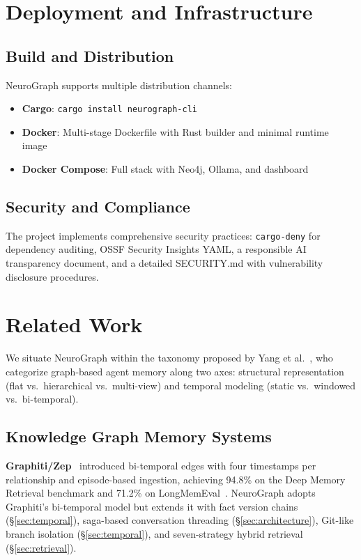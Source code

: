 \documentclass[11pt,a4paper,twocolumn]{article}
\begin{document}
\section{Deployment and Infrastructure}
\label{sec:deployment}

\subsection{Build and Distribution}

NeuroGraph supports multiple distribution channels:
\begin{itemize}[leftmargin=*]
  \item \textbf{Cargo}: \texttt{cargo install neurograph-cli}
  \item \textbf{Docker}: Multi-stage Dockerfile with Rust builder
    and minimal runtime image
  \item \textbf{Docker Compose}: Full stack with Neo4j, Ollama,
    and dashboard
\end{itemize}

\subsection{Security and Compliance}

The project implements comprehensive security practices:
\texttt{cargo-deny} for dependency auditing, OSSF Security Insights
YAML, a responsible AI transparency document, and a detailed
SECURITY.md with vulnerability disclosure procedures.

\section{Related Work}
\label{sec:related}

We situate NeuroGraph within the taxonomy proposed by
Yang et al.~\cite{yang2026graph}, who categorize graph-based agent
memory along two axes: structural representation (flat vs.\
hierarchical vs.\ multi-view) and temporal modeling
(static vs.\ windowed vs.\ bi-temporal).

\subsection{Knowledge Graph Memory Systems}

\textbf{Graphiti/Zep}~\cite{graphiti2024,graphiti2025} introduced
bi-temporal edges with four timestamps per relationship and
episode-based ingestion, achieving 94.8\% on the Deep Memory
Retrieval benchmark and 71.2\% on LongMemEval~\cite{longmemeval2025}.
NeuroGraph adopts Graphiti's bi-temporal model but extends it with
fact version chains (\S\ref{sec:temporal}), saga-based conversation
threading (\S\ref{sec:architecture}), Git-like branch isolation
(\S\ref{sec:temporal}), and seven-strategy hybrid retrieval
(\S\ref{sec:retrieval}).
\end{document}
